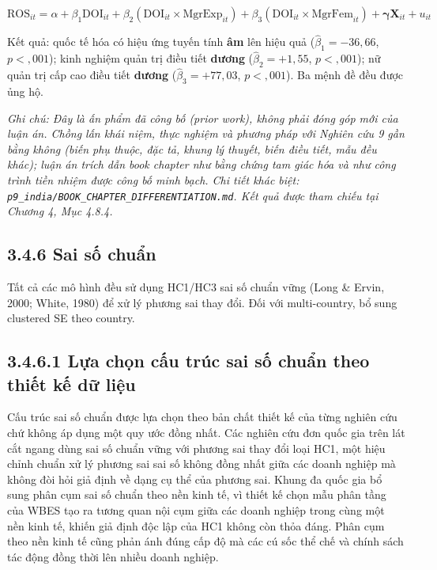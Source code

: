 \documentclass[
  a4paper,
  13pt]{extreport}
\begin{document}
\[\mathrm{ROS}_{it} = \alpha + \beta_1 \mathrm{DOI}_{it} + \beta_2(\mathrm{DOI}_{it}\times\mathrm{MgrExp}_{it}) + \beta_3(\mathrm{DOI}_{it}\times\mathrm{MgrFem}_{it}) + \boldsymbol{\gamma}\mathbf{X}_{it} + u_{it}\]

Kết quả: quốc tế hóa có hiệu ứng tuyến tính \textbf{âm} lên hiệu quả
(\(\hat\beta_1 = -36{,}66\), \(p < {,}001\)); kinh nghiệm quản trị điều
tiết \textbf{dương} (\(\hat\beta_2 = +1{,}55\), \(p < {,}001\)); nữ quản
trị cấp cao điều tiết \textbf{dương} (\(\hat\beta_3 = +77{,}03\),
\(p < {,}001\)). Ba mệnh đề đều được ủng hộ.

\emph{Ghi chú: Đây là ấn phẩm đã công bố (prior work), không phải đóng
góp mới của luận án. Chồng lấn khái niệm, thực nghiệm và phương pháp với
Nghiên cứu 9 gần bằng không (biến phụ thuộc, đặc tả, khung lý thuyết,
biến điều tiết, mẫu đều khác); luận án trích dẫn book chapter như bằng
chứng tam giác hóa và như công trình tiền nhiệm được công bố minh bạch.
Chi tiết khác biệt:
\texttt{p9\_india/BOOK\_CHAPTER\_DIFFERENTIATION.md}. Kết quả được tham
chiếu tại Chương 4, Mục 4.8.4.}

\hypertarget{sai-sux1ed1-chuux1ea9n}{%
\subsection{3.4.6 Sai số chuẩn}\label{sai-sux1ed1-chuux1ea9n}}

Tất cả các mô hình đều sử dụng HC1/HC3 sai số chuẩn vững (Long \& Ervin,
2000; White, 1980) để xử lý phương sai thay đổi. Đối với multi-country,
bổ sung clustered SE theo country.

\hypertarget{lux1ef1a-chux1ecdn-cux1ea5u-truxfac-sai-sux1ed1-chuux1ea9n-theo-thiux1ebft-kux1ebf-dux1eef-liux1ec7u}{%
\subsection{3.4.6.1 Lựa chọn cấu trúc sai số chuẩn theo thiết kế dữ
liệu}\label{lux1ef1a-chux1ecdn-cux1ea5u-truxfac-sai-sux1ed1-chuux1ea9n-theo-thiux1ebft-kux1ebf-dux1eef-liux1ec7u}}

Cấu trúc sai số chuẩn được lựa chọn theo bản chất thiết kế của từng
nghiên cứu chứ không áp dụng một quy ước đồng nhất. Các nghiên cứu đơn
quốc gia trên lát cắt ngang dùng sai số chuẩn vững với phương sai thay
đổi loại HC1, một hiệu chỉnh chuẩn xử lý phương sai sai số không đồng
nhất giữa các doanh nghiệp mà không đòi hỏi giả định về dạng cụ thể của
phương sai. Khung đa quốc gia bổ sung phân cụm sai số chuẩn theo nền
kinh tế, vì thiết kế chọn mẫu phân tầng của WBES tạo ra tương quan nội
cụm giữa các doanh nghiệp trong cùng một nền kinh tế, khiến giả định độc
lập của HC1 không còn thỏa đáng. Phân cụm theo nền kinh tế cũng phản ánh
đúng cấp độ mà các cú sốc thể chế và chính sách tác động đồng thời lên
nhiều doanh nghiệp.
\end{document}
